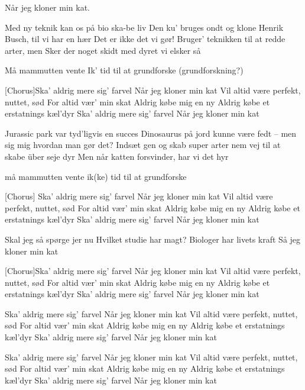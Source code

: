 \documentclass[a4paper,12pt]{article}
\begin{document}
\begin{song}

Når jeg kloner min kat.

Med ny teknik kan os på bio ska-be liv
Den ku' bruges ondt og klone Henrik Busch, til vi har en hær
Det er ikke det vi gør!
Bruger' teknikken til at redde arter, men
Sker der noget skidt med dyret vi elsker så

Må mammutten vente
Ik' tid til at grundforske (grundforskning?)

[Chorus]Ska' aldrig mere sig' farvel
Når jeg kloner min kat
Vil altid være perfekt, nuttet, sød
For altid vær' min skat
Aldrig købe mig en ny
Aldrig købe et erstatnings kæl'dyr
Ska' aldrig mere sig' farvel
Når jeg kloner min kat

Jurassic park var tyd'ligvis en succes
Dinosaurus på jord kunne være fedt -- men sig mig hvordan man gør det?
Indsæt gen og skab super arter
nem vej til at skabe über seje dyr
Men når katten forsvinder, har vi det hyr

må mammutten vente
ik(ke) tid til at grundforske

[Chorus]
Ska' aldrig mere sig' farvel
Når jeg kloner min kat
Vil altid være perfekt, nuttet, sød
For altid vær' min skat
Aldrig købe mig en ny
Aldrig købe et erstatnings kæl'dyr
Ska' aldrig mere sig' farvel
Når jeg kloner min kat

Skal jeg så spørge jer nu
Hvilket studie har magt?
Biologer har livets kraft
Så jeg kloner min kat

[Chorus]Ska' aldrig mere sig' farvel
Når jeg kloner min kat
Vil altid være perfekt, nuttet, sød
For altid vær' min skat
Aldrig købe mig en ny
Aldrig købe et erstatnings kæl'dyr
Ska' aldrig mere sig' farvel
Når jeg kloner min kat

Ska' aldrig mere sig' farvel
Når jeg kloner min kat
Vil altid være perfekt, nuttet, sød
For altid vær' min skat
Aldrig købe mig en ny
Aldrig købe et erstatnings kæl'dyr
Ska' aldrig mere sig' farvel
Når jeg kloner min kat

Ska' aldrig mere sig' farvel
Når jeg kloner min kat
Vil altid være perfekt, nuttet, sød
For altid vær' min skat
Aldrig købe mig en ny
Aldrig købe et erstatnings kæl'dyr
Ska' aldrig mere sig' farvel
Når jeg kloner min kat

\end{song}
\end{document}
